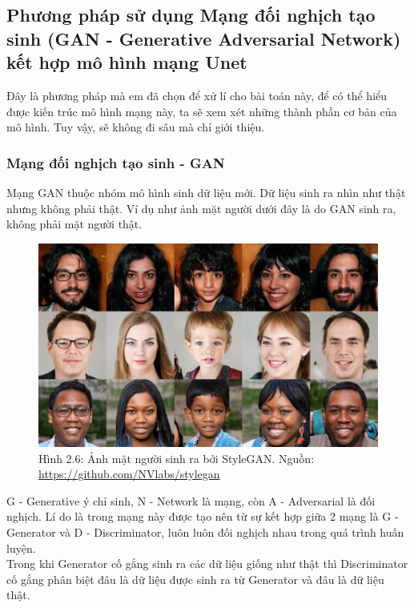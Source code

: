 \documentclass[a4paper]{article}
\begin{document}
\subsection{Phương pháp sử dụng Mạng đối nghịch tạo sinh (GAN - Generative Adversarial Network) kết hợp mô hình mạng Unet}

Đây là phương pháp mà em đã chọn để xử lí cho bài toán này, để có thể hiểu được kiến trúc mô hình mạng này, ta sẽ xem xét những thành phần cơ bản của mô hình. Tuy vậy, sẽ không đi sâu mà chỉ giới thiệu.

\subsubsection{Mạng đối nghịch tạo sinh - GAN}
Mạng GAN thuộc nhóm mô hình sinh dữ liệu mới. Dữ liệu sinh ra nhìn như thật nhưng không phải thật. Ví dụ như ảnh mặt người dưới đây là do GAN sinh ra, không phải mặt người thật.

\begin{figure}[h!]
\centering
\includegraphics[width=13cm]{images/2_6.PNG}
\caption{Hình 2.6: Ảnh mặt người sinh ra bởi StyleGAN. Nguồn: \href{https://github.com/NVlabs/stylegan}{https://github.com/NVlabs/stylegan}}
\end{figure}

\noindent
G - Generative ý chỉ sinh, N - Network là mạng, còn A - Adversarial là đối nghịch. Lí do là trong mạng này được tạo nên từ sự kết hợp giữa 2 mạng là G - Generator và D - Discriminator, luôn luôn đối nghịch nhau trong quá trình huấn luyện.\\
Trong khi Generator cố gắng sinh ra các dữ liệu giống như thật thì Discriminator cố gắng phân biệt đâu là dữ liệu được sinh ra từ Generator và đâu là dữ liệu thật.\\
\end{document}
